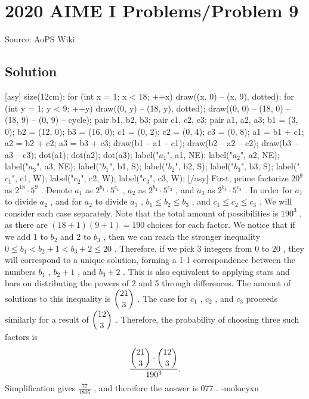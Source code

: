 \documentclass[12pt]{article}
\begin{document}
\section*{{2020 AIME I Problems/Problem 9}}
Source: AoPS Wiki

\subsection*{Solution}
[asy] size(12cm); for (int x = 1; x < 18; ++x) { draw((x, 0) -- (x, 9), dotted); } for (int y = 1; y < 9; ++y) { draw((0, y) -- (18, y), dotted); } draw((0, 0) -- (18, 0) -- (18, 9) -- (0, 9) -- cycle); pair b1, b2, b3; pair c1, c2, c3; pair a1, a2, a3; b1 = (3, 0); b2 = (12, 0); b3 = (16, 0); c1 = (0, 2); c2 = (0, 4); c3 = (0, 8); a1 = b1 + c1; a2 = b2 + c2; a3 = b3 + c3; draw(b1 -- a1 -- c1); draw(b2 -- a2 -- c2); draw(b3 -- a3 -- c3); dot(a1); dot(a2); dot(a3); label("$a_1$", a1, NE); label("$a_2$", a2, NE); label("$a_3$", a3, NE); label("$b_1$", b1, S); label("$b_2$", b2, S); label("$b_3$", b3, S); label("$c_1$", c1, W); label("$c_2$", c2, W); label("$c_3$", c3, W); [/asy] First, prime factorize $20^9$ as $2^{18} \cdot 5^9$ . Denote $a_1$ as $2^{b_1} \cdot 5^{c_1}$ , $a_2$ as $2^{b_2} \cdot 5^{c_2}$ , and $a_3$ as $2^{b_3} \cdot 5^{c_3}$ . In order for $a_1$ to divide $a_2$ , and for $a_2$ to divide $a_3$ , $b_1\le b_2\le b_3$ , and $c_1\le c_2\le c_3$ . We will consider each case separately. Note that the total amount of possibilities is $190^3$ , as there are $(18+1)(9+1)=190$ choices for each factor. We notice that if we add $1$ to $b_2$ and $2$ to $b_3$ , then we can reach the stronger inequality $0\le b_1<b_2+1<b_3+2\le 20$ . Therefore, if we pick $3$ integers from $0$ to $20$ , they will correspond to a unique solution, forming a 1-1 correspondence between the numbers $b_1$ , $b_2+1$ , and $b_3+2$ . This is also equivalent to applying stars and bars on distributing the powers of 2 and 5 through differences. The amount of solutions to this inequality is $\dbinom{21}{3}$ . The case for $c_1$ , $c_2$ , and $c_3$ proceeds similarly for a result of $\dbinom{12}{3}$ . Therefore, the probability of choosing three such factors is \[\frac{\dbinom{21}{3} \cdot \dbinom{12}{3}}{190^3}.\] Simplification gives $\frac{77}{1805}$ , and therefore the answer is $\boxed{077}$ . -molocyxu
\end{document}
